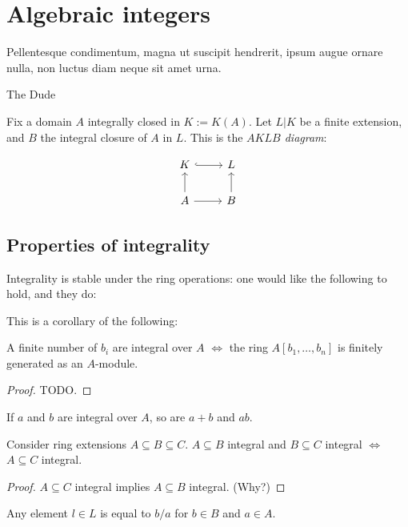 \chapter{Algebraic integers}

\epigraph{Pellentesque condimentum, magna ut suscipit hendrerit, ipsum augue
  ornare nulla, non luctus diam neque sit amet urna.}{The Dude} 

Fix a domain $A$ integrally closed in $K := K(A)$. Let $L|K$ be a finite
extension, and $B$ the integral closure of $A$ in $L$. This is the \emph{$AKLB$
  diagram}:

\[
  \begin{tikzcd}
    K \arrow[r, hook] & L \\
    A \arrow[u] \arrow[r] & B \arrow[u]
  \end{tikzcd}
\]

\section{Properties of integrality}

Integrality is stable under the ring operations: one would like the following to
hold, and they do:

This is a corollary of the following:

\begin{theorem}{\label{module-integrality}}
  A finite number of $b_i$ are integral over $A$ $\iff$ the ring $A[b_1,\ldots,b_n]$ is
  finitely generated as an $A$-module.
\end{theorem}
\begin{proof}
  TODO.
\end{proof}

\begin{corollary}{\label{integrality-of-sums-products}}
  If $a$ and $b$ are integral over $A$, so are $a + b$ and $ab$.
\end{corollary}

\begin{theorem}{\label{integrality-trans}}
  Consider ring extensions $A \subseteq B \subseteq C$.
  $A \subseteq B$ integral and $B \subseteq C$ integral $\iff$ $A \subseteq C$ integral.
\end{theorem}
\begin{proof}
  $A \subseteq C$ integral implies $A \subseteq B$ integral. (Why?)
\end{proof}

\begin{theorem}
  Any element $l \in L$ is equal to $b/a$ for $b \in B$ and $a \in A$.
\end{theorem}

